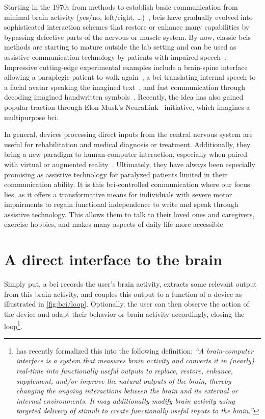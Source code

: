 Starting in the 1970s from methods to establish basic communication from minimal brain
activity (yes/no, left/right, \ldots)~\cite{Wolpaw2002}, \acp{bci} have gradually evolved
into sophisticated interaction schemes that restore or enhance many capabilities by
bypassing defective parts of the nervous or muscle system.
By now, classic \acp{bci} methods are starting to mature outside the lab setting and can
be used as assistive communication technology by patients with impaired
speech~\cite{Wolpaw2018,Milekovic2018}.
Impressive cutting-edge experimental examples include a brain-spine interface allowing a
paraplegic patient to walk again~\cite{Lorach2023}, a \ac{bci} translating internal
speech to a facial avatar speaking the imagined text~\cite{Metzger2023}, and fast
communication through decoding imagined handwritten symbols~\cite{Willett2021}.
Recently, the idea has also gained popular traction through Elon Musk's
NeuraLink~\cite{Musk2019} initiative, which imagines a multipurpose \ac{bci}.

In general, devices processing direct inputs from the central nervous system are useful
for rehabilitation and medical diagnosis or treatment.
Additionally, they bring a new paradigm to human-computer interaction, especially when
paired with virtual or augmented reality~\cite{SiMohammed2017}.
Ultimately, they have always been especially promising as assistive technology for
paralyzed patients limited in their communication ability.
It is this \ac{bci}-controlled communication where our focus lies, as it offers a
transformative means for individuals with severe motor impairments to regain functional
independence to write and speak through assistive technology.
This allows them to talk to their loved ones and caregivers, exercise hobbies, and makes
many aspects of daily life more accessible.

\section{A direct interface to the brain}

Simply put, a \ac{bci} records the user's brain activity, extracts some relevant output
from this brain activity, and couples this output to a function of a device as
illustrated in \autoref{fig:bci/loop}.
Optionally, the user can then observe the action of the device and adapt their behavior
or brain activity accordingly, closing the loop\footnote{\textcite{BCISociety2024} has
recently formalized this into the following definition: \it``A brain-computer interface
is a system that measures brain activity and converts it in (nearly) real-time into
functionally useful outputs to replace, restore, enhance, supplement, and/or improve the
natural outputs of the brain, thereby changing the ongoing interactions between the
brain and its external or internal environments.
It may additionally modify brain activity using targeted delivery of stimuli to create
functionally useful inputs to the brain.''}.

